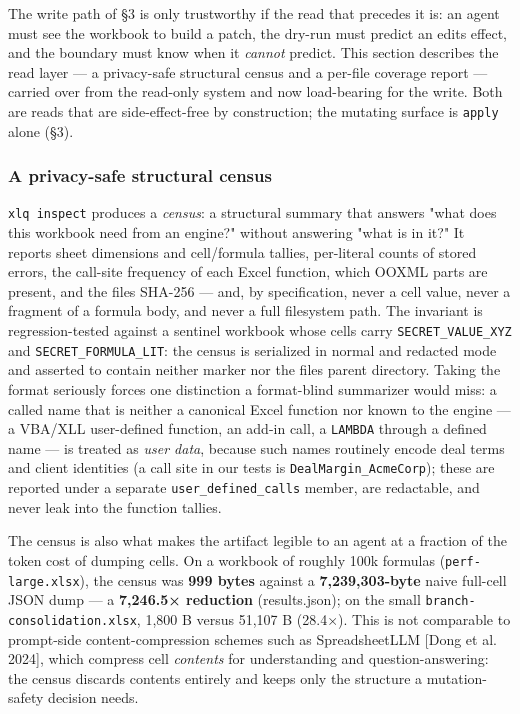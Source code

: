 \documentclass[
]{article}
\begin{document}
The write path of §3 is only trustworthy if the read that precedes it
is: an agent must see the workbook to build a patch, the dry-run must
predict an edit\textquotesingle s effect, and the boundary must know
when it \emph{cannot} predict. This section describes the read layer ---
a privacy-safe structural census and a per-file coverage report ---
carried over from the read-only system and now load-bearing for the
write. Both are reads that are side-effect-free by construction; the
mutating surface is \texttt{apply} alone (§3).

\subsubsection{A privacy-safe structural
census}\label{a-privacy-safe-structural-census}

\texttt{xlq\ inspect} produces a \emph{census}: a structural summary
that answers "what does this workbook need from an engine?" without
answering "what is in it?" It reports sheet dimensions and cell/formula
tallies, per-literal counts of stored errors, the call-site frequency of
each Excel function, which OOXML parts are present, and the
file\textquotesingle s SHA-256 --- and, by specification, never a cell
value, never a fragment of a formula body, and never a full filesystem
path. The invariant is regression-tested against a sentinel workbook
whose cells carry \texttt{SECRET\_VALUE\_XYZ} and
\texttt{SECRET\_FORMULA\_LIT}: the census is serialized in normal and
redacted mode and asserted to contain neither marker nor the
file\textquotesingle s parent directory. Taking the format seriously
forces one distinction a format-blind summarizer would miss: a called
name that is neither a canonical Excel function nor known to the engine
--- a VBA/XLL user-defined function, an add-in call, a \texttt{LAMBDA}
through a defined name --- is treated as \emph{user data}, because such
names routinely encode deal terms and client identities (a call site in
our tests is \texttt{DealMargin\_AcmeCorp}); these are reported under a
separate \texttt{user\_defined\_calls} member, are redactable, and never
leak into the function tallies.

The census is also what makes the artifact legible to an agent at a
fraction of the token cost of dumping cells. On a workbook of roughly
100k formulas (\texttt{perf-large.xlsx}), the census was \textbf{999
bytes} against a \textbf{7,239,303-byte} naive full-cell JSON dump --- a
\textbf{7,246.5× reduction} (results.json); on the small
\texttt{branch-consolidation.xlsx}, 1,800 B versus 51,107 B (28.4×).
This is not comparable to prompt-side content-compression schemes such
as SpreadsheetLLM {[}Dong et al. 2024{]}, which compress cell
\emph{contents} for understanding and question-answering: the census
discards contents entirely and keeps only the structure a
mutation-safety decision needs.
\end{document}
